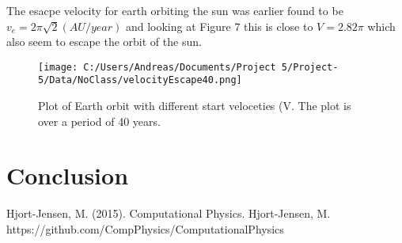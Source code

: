\documentclass[twoside,twocolumn]{article}
\begin{document}
The esacpe velocity for earth orbiting the sun was earlier found to be $v_e = 2\pi \sqrt{2} (AU/year)$ and looking at Figure 7 this is close to $V = 2.82\pi$ which also seem to escape the orbit of the sun.
\begin{figure}[H]  \texttt{[image: C:/Users/Andreas/Documents/Project 5/Project-5/Data/NoClass/velocityEscape40.png]}
  \caption{Plot of Earth orbit with different start veloceties (V. The plot is over a period of 40 years.}
  \label{fig:boat2}
\end{figure}

\section{Conclusion}


\begin{thebibliography}{99} %
Hjort-Jensen, M. (2015).
\newblock Computational Physics.
Hjort-Jensen, M.
\newblock https://github.com/CompPhysics/ComputationalPhysics

 
\end{thebibliography}

\end{document}
